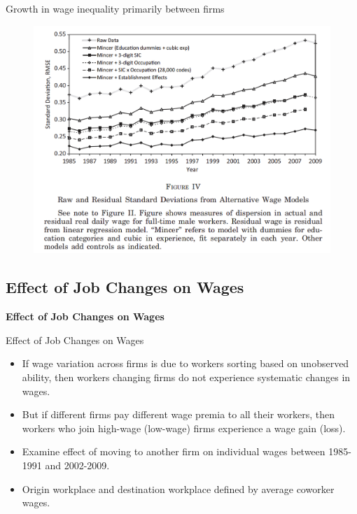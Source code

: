 \documentclass[notes=show]{beamer}
\begin{document}
\begin{frame}{Growth in wage inequality primarily between firms}
\begin{figure}[p!]
 \includegraphics[width=.9\textwidth]{figures/Fig4} 
\end{figure}
\end{frame}

\subsection*{Effect of Job Changes on Wages}

\begin{frame}
	\centering
	\textbf{Effect of Job Changes on Wages}
\end{frame}

\begin{frame}{Effect of Job Changes on Wages}
	\begin{itemize}
		\item If wage variation across firms is due to workers sorting based on unobserved ability, then workers changing firms do not experience systematic changes in wages. \medskip
		\item But if different firms pay different wage premia to all their workers, then workers who join high-wage (low-wage) firms  experience a wage gain (loss). \medskip 
		\item Examine effect of moving to another firm on individual wages between 1985-1991 and 2002-2009. \medskip
		\item Origin workplace and destination workplace defined by average coworker wages.
	\end{itemize}
\end{frame}
\end{document}
